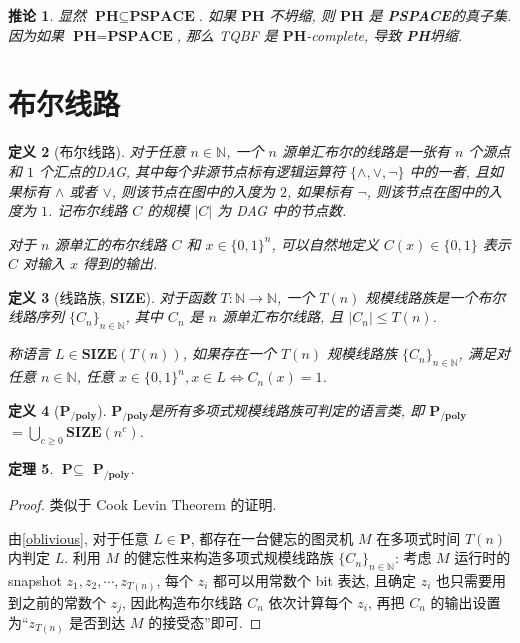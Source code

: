 \documentclass[8pt]{article}
\theoremstyle{compact}
\newtheorem{theorem}{定理}[section]
\newtheorem{definition}[theorem]{定义}
\newtheorem{corollary}[theorem]{推论}
\def\le{\leqslant}
\def\ge{\geqslant}
\def\P{\textbf{P}}
\def\PSPACE{\textbf{PSPACE}}
\def\PH{\textbf{PH}}
\def\SIZE{\textbf{SIZE}}
\def\PPOLY{$\textbf{P}_{\textbf{/poly}}$}
\begin{document}
\begin{corollary}
	显然 $\PH \subseteq \PSPACE$. 如果 $\PH$ 不坍缩, 则 $\PH$ 是 \PSPACE 的真子集. 因为如果 $\PH = \PSPACE$, 那么 \textsf{TQBF} 是 $\PH$-complete, 导致 \PH 坍缩.
\end{corollary}

\section{布尔线路}
\begin{definition}[布尔线路]
	对于任意 $n \in \mathbb N$, 一个 $n$ 源单汇布尔的线路是一张有 $n$ 个源点和 $1$ 个汇点的DAG, 其中每个非源节点标有逻辑运算符 $\{\wedge, \vee, \lnot\}$ 中的一者, 且如果标有 $\wedge$ 或者 $\vee$, 则该节点在图中的入度为 $2$, 如果标有 $\lnot$, 则该节点在图中的入度为 $1$. 记布尔线路 $C$ 的规模 $|C|$ 为 DAG 中的节点数.

	对于 $n$ 源单汇的布尔线路 $C$ 和 $x \in \{0, 1\}^n$, 可以自然地定义 $C(x) \in \{0, 1\}$ 表示 $C$ 对输入 $x$ 得到的输出. 
\end{definition}
\begin{definition}[线路族, \SIZE]
	对于函数 $T : \mathbb N \to \mathbb N$, 一个 $T(n)$ 规模线路族是一个布尔线路序列 $\{C_n\}_{n \in \mathbb N}$, 其中 $C_n$ 是 $n$ 源单汇布尔线路, 且 $|C_n| \le T(n)$.

	称语言 $L \in \SIZE(T(n))$, 如果存在一个 $T(n)$ 规模线路族 $\{C_n\}_{n \in \mathbb N}$, 满足对任意 $n \in \mathbb N$, 任意 $x \in \{0, 1\}^n, x \in L \Leftrightarrow C_n(x) = 1$.
\end{definition}
\begin{definition}[\PPOLY]
	\PPOLY 是所有多项式规模线路族可判定的语言类, 即 \PPOLY $ = \bigcup_{c \ge 0} \SIZE(n^c)$.
\end{definition}
\begin{theorem}
	$\P \subseteq$ \PPOLY.
	\label{P_subset_PPOLY}
\end{theorem}
\begin{proof}
	类似于 Cook Levin Theorem 的证明.

	由\cref{oblivious}, 对于任意 $L \in \P$, 都存在一台健忘的图灵机 $M$ 在多项式时间 $T(n)$ 内判定 $L$. 利用 $M$ 的健忘性来构造多项式规模线路族 $\{C_n\}_{n \in \mathbb N}$: 考虑 $M$ 运行时的 snapshot $z_1, z_2, \cdots, z_{T(n)}$, 每个 $z_i$ 都可以用常数个 bit 表达, 且确定 $z_i$ 也只需要用到之前的常数个 $z_j$, 因此构造布尔线路 $C_n$ 依次计算每个 $z_i$, 再把 $C_n$ 的输出设置为“$z_{T(n)}$ 是否到达 $M$ 的接受态”即可.
\end{proof}
\end{document}
